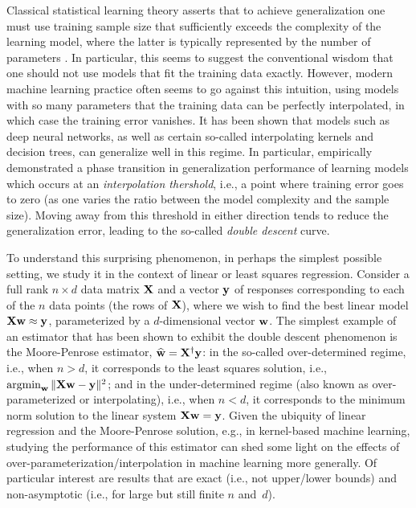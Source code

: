 \documentclass[11pt]{article}
\begin{document}
Classical statistical learning theory asserts that to achieve generalization
one must use training sample size that sufficiently exceeds the complexity of
the learning model, where the latter is typically represented by the number of
parameters \citep[or some related structural parameter; see][]{HFT09}.  In particular,
this seems to suggest the conventional wisdom that one should not use models
that fit the training data exactly.  However, modern machine learning practice
often seems to go against this intuition, using models with so many parameters
that the training data can be perfectly interpolated, in which case the
training error vanishes. It has been shown that models such as deep neural
networks, as well as certain so-called interpolating kernels and decision
trees, can generalize well in this regime. In particular,
\cite{BHMM19} empirically demonstrated a phase transition in generalization
performance of learning models which occurs at an \emph{interpolation
thershold}, i.e., a point where training error goes to zero (as one varies the
ratio between the model complexity and the sample size). Moving away from this
threshold in either direction tends to reduce the generalization error, leading
to the so-called \emph{double descent} curve.

To understand this
surprising phenomenon, in perhaps the simplest possible setting, we
study it in the context of linear or least squares regression.
Consider a full rank $n\times d$ data matrix $\mathbf X$ and a vector $\mathbf y$ of
responses corresponding to each of the $n$ data points (the rows of $\mathbf X$), where we wish to
find the best linear model $\mathbf X\mathbf w\approx \mathbf y$, parameterized by a
$d$-dimensional vector $\mathbf w$.
The simplest example of an estimator that has been shown to exhibit
the double descent phenomenon \citep{belkin2019two} is the
Moore-Penrose estimator, $\widehat{\mathbf w}=\mathbf X^\dagger\mathbf y$:
in the so-called over-determined regime, i.e., when $n>d$, it corresponds to the
least squares solution, i.e., $\operatorname*{\mathop{\mathrm{argmin}}}_{\mathbf w} \|\mathbf X\mathbf w-\mathbf y\|^2$; and in the
under-determined regime (also known as
over-parameterized or interpolating), i.e., when $n<d$, it
corresponds to the minimum norm solution to the linear system $\mathbf X\mathbf w=\mathbf y$.
Given the ubiquity of linear regression and the Moore-Penrose
solution, e.g., in kernel-based machine learning, studying the
performance of this estimator can shed some light on the effects of
over-parameterization/interpolation in machine learning more generally.
Of particular interest are results that are exact (i.e., not upper/lower bounds) and
non-asymptotic (i.e., for large but still finite $n$ and~$d$).
\end{document}
